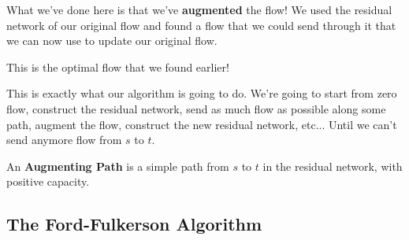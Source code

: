 \documentclass[12pt]{article}
\newcommand{\fc}[2]{
  \blue{#1}/\red{#2}
}
\begin{document}
{\begin{center}
    \end{center}

    What we've done here is that we've {\bf augmented} the flow! We used the
    residual network of our original flow and found a flow that we could send
    through it that we can now use to update our original flow.

    \begin{center}
    \end{center}

    This is the optimal flow that we found earlier!
  }

  This is exactly what our algorithm is going to do. We're going to start from
  zero flow, construct the residual network, send as much flow as possible along
  some path, augment the flow, construct the new residual network, etc... Until
  we can't send anymore flow from $s$ to $t$.


   {
    An {\bf Augmenting Path} is a simple path from $s$ to $t$ in the residual
    network, with positive capacity.
  }

  \subsection{The Ford-Fulkerson Algorithm}
\end{document}
